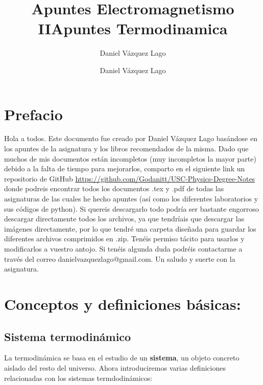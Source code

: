 \documentclass[12pt,a4paper]{article}
\author{Daniel Vázquez Lago}
\title{Apuntes Electromagnetismo II}
\author{Daniel Vázquez Lago}
\title{Apuntes Termodinamica}
\begin{document}
\maketitle

\newpage

\tableofcontents

\newpage

\section*{Prefacio}

Hola a todos. Este documento fue creado por Daniel Vázquez Lago basándose en los apuntes de la asignatura y los libros recomendados de la misma. Dado que muchos de mis documentos están incompletos (muy incompletos la mayor parte) debido a la falta de tiempo para mejorarlos, comparto en el siguiente link un repositorio de GitHub \url{https://github.com/Godanitt/USC-Physics-Degree-Notes} donde podreis encontrar todos los documentos .tex y .pdf de todas las asignaturas de las cuales he hecho apuntes (así como los diferentes laboratorios y sus códigos de python). Si quereis descargarlo todo podría ser bastante engorroso descargar directamente todos los archivos, ya que tendríais que descargar las imágenes directamente, por lo que tendré una carpeta diseñada para guardar los diferentes archivos comprimidos en .zip. Tenéis permiso tácito para usarlos y modificarlos a vuestro antojo. Si tenéis algunda duda podréis contactarme a través del correo danielvazquezlago@gmail.com. Un saludo y suerte con la asignatura.

\newpage

\section{Conceptos y definiciones básicas:}

\subsection{Sistema termodinámico}


La termodinámica se basa en el estudio de un \textbf{sistema}, un objeto concreto aislado del resto del universo. Ahora introduciremos varias definiciones relacionadas con los sistemas termdodinámicos:
\end{document}
